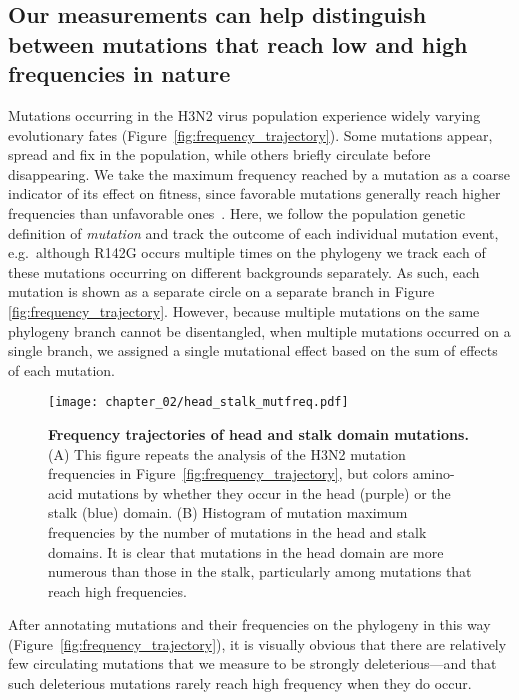 \subsection{Our measurements can help distinguish between mutations that reach low and high frequencies in nature}
Mutations occurring in the H3N2 virus population experience widely varying evolutionary fates (Figure~\ref{fig:frequency_trajectory}).
Some mutations appear, spread and fix in the population, while others briefly circulate before disappearing.
We take the maximum frequency reached by a mutation as a coarse indicator of its effect on fitness, since favorable mutations generally reach higher frequencies than unfavorable ones~\citep{ewens2012mathematical}.
Here, we follow the population genetic definition of \textit{mutation} and track the outcome of each individual mutation event, e.g.\ although R142G occurs multiple times on the phylogeny we track each of these mutations occurring on different backgrounds separately.
As such, each mutation is shown as a separate circle on a separate branch in Figure \ref{fig:frequency_trajectory}.
However, because multiple mutations on the same phylogeny branch cannot be disentangled, when multiple mutations occurred on a single branch, we assigned a single mutational effect based on the sum of effects of each mutation.

\begin{figure}
\centerline{\texttt{[image: chapter\_02/head\_stalk\_mutfreq.pdf]}}
\caption{\label{suppfig:head_stalk_mutfreq_supp}
{\bf Frequency trajectories of head and stalk domain mutations.}
(A) This figure repeats the analysis of the H3N2 mutation frequencies in Figure~\ref{fig:frequency_trajectory}, but colors amino-acid mutations by whether they occur in the head (purple) or the stalk (blue) domain.
(B) Histogram of mutation maximum frequencies by the number of mutations in the head and stalk domains.
It is clear that mutations in the head domain are more numerous than those in the stalk, particularly among mutations that reach high frequencies.
}
\end{figure}

After annotating mutations and their frequencies on the phylogeny in this way (Figure~\ref{fig:frequency_trajectory}), it is visually obvious that there are relatively few circulating mutations that we measure to be strongly deleterious---and that such deleterious mutations rarely reach high frequency when they do occur.

